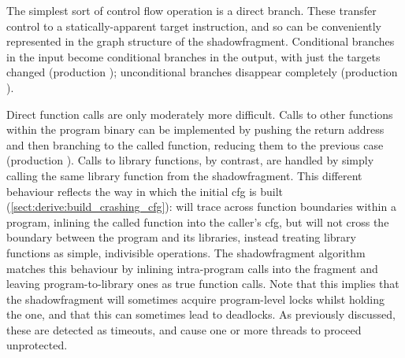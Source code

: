 The simplest sort of control flow operation is a direct branch.  These
transfer control to a statically-apparent target instruction, and so
can be conveniently represented in the graph structure of the
\gls{shadowfragment}.  Conditional branches in the input become
conditional branches in the output, with just the targets changed
(production ); unconditional branches disappear
completely (production ).

Direct function calls are only moderately more difficult.  Calls to
other functions within the program binary can be implemented by
pushing the return address and then branching to the called function,
reducing them to the previous case (production ).
Calls to library functions, by contrast, are handled by simply calling
the same library function from the \gls{shadowfragment}.  This
different behaviour reflects the way in which the initial \gls{cfg} is
built (\autoref{sect:derive:build_crashing_cfg}): {\technique} will
trace across function boundaries within a program, inlining the called
function into the caller's \gls{cfg}, but will not cross the boundary
between the program and its libraries, instead treating library
functions as simple, indivisible operations.  The \gls{shadowfragment}
algorithm matches this behaviour by inlining intra-program calls into
the fragment and leaving program-to-library ones as true function
calls.  Note that this implies that the \gls{shadowfragment} will
sometimes acquire program-level locks whilst holding the {\technique}
one, and that this can sometimes lead to deadlocks.  As previously
discussed, these are detected as timeouts, and cause one or more
threads to proceed unprotected.

